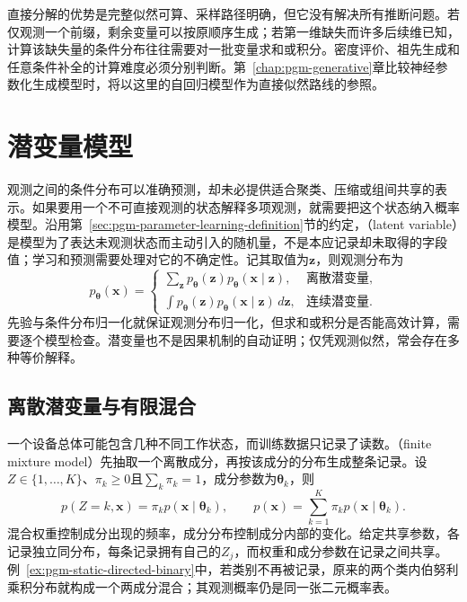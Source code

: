 直接分解的优势是完整似然可算、采样路径明确，但它没有解决所有推断问题。若仅观测一个前缀，剩余变量可以按原顺序生成；若第一维缺失而许多后续维已知，计算该缺失量的条件分布往往需要对一批变量求和或积分。密度评价、祖先生成和任意条件补全的计算难度必须分别判断。第~\ref{chap:pgm-generative}章比较神经参数化生成模型时，将以这里的自回归模型作为直接似然路线的参照。

\section{潜变量模型}
\label{sec:pgm-static-directed-latent}

观测之间的条件分布可以准确预测，却未必提供适合聚类、压缩或组间共享的表示。如果要用一个不可直接观测的状态解释多项观测，就需要把这个状态纳入概率模型。沿用第~\ref{sec:pgm-parameter-learning-definition}节的约定，（latent variable）是模型为了表达未观测状态而主动引入的随机量，不是本应记录却未取得的字段值；学习和预测需要处理对它的不确定性。记其取值为$\bm{z}$，则观测分布为
\begin{equation}
  \label{eq:pgm-static-directed-marginal}
  p_{\bm{\theta}}(\bm{x})=
  \begin{cases}
    \sum_{\bm{z}}p_{\bm{\theta}}(\bm{z})
          p_{\bm{\theta}}(\bm{x}\mid\bm{z}),
          &\text{离散潜变量},\\
    \int p_{\bm{\theta}}(\bm{z})
          p_{\bm{\theta}}(\bm{x}\mid\bm{z})\,d\bm{z},
          &\text{连续潜变量}.
  \end{cases}
\end{equation}
先验与条件分布归一化就保证观测分布归一化，但求和或积分是否能高效计算，需要逐个模型检查。潜变量也不是因果机制的自动证明；仅凭观测似然，常会存在多种等价解释。

\subsection{离散潜变量与有限混合}
\label{sec:pgm-static-directed-mixtures}

一个设备总体可能包含几种不同工作状态，而训练数据只记录了读数。（finite mixture model）先抽取一个离散成分，再按该成分的分布生成整条记录。设$Z\in\{1,\ldots,K\}$、$\pi_k\ge0$且$\sum_k\pi_k=1$，成分参数为$\bm{\theta}_k$，则
\begin{equation}
  \label{eq:pgm-static-directed-mixture}
  p(Z=k,\bm{x})=\pi_k p(\bm{x}\mid\bm{\theta}_k),
  \qquad
  p(\bm{x})=\sum_{k=1}^{K}\pi_kp(\bm{x}\mid\bm{\theta}_k).
\end{equation}
混合权重控制成分出现的频率，成分分布控制成分内部的变化。给定共享参数，各记录独立同分布，每条记录拥有自己的$Z_j$，而权重和成分参数在记录之间共享。例~\ref{ex:pgm-static-directed-binary}中，若类别不再被记录，原来的两个类内伯努利乘积分布就构成一个两成分混合；其观测概率仍是同一张二元概率表。

